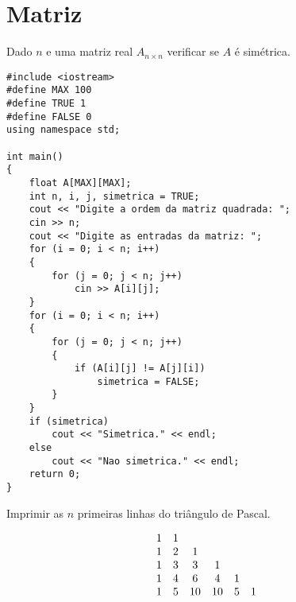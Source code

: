 \documentclass[a4paper]{memoir}
\begin{document}
\chapter{Matriz}

\begin{center}
\end{center}

\begin{prob}\label{prob306.cpp}
Dado $n$ e uma matriz real $A_{n \times n}$ verificar se $A$ é simétrica.
\end{prob}

\begin{sol}
\begin{lstlisting}
#include <iostream>
#define MAX 100
#define TRUE 1
#define FALSE 0
using namespace std;

int main()
{
    float A[MAX][MAX];
    int n, i, j, simetrica = TRUE;
    cout << "Digite a ordem da matriz quadrada: ";
    cin >> n;
    cout << "Digite as entradas da matriz: ";
    for (i = 0; i < n; i++)
    {
        for (j = 0; j < n; j++)
            cin >> A[i][j];
    }
    for (i = 0; i < n; i++)
    {
        for (j = 0; j < n; j++)
        {
            if (A[i][j] != A[j][i])
                simetrica = FALSE;
        }
    }
    if (simetrica)
        cout << "Simetrica." << endl;
    else
        cout << "Nao simetrica." << endl;
    return 0;
}
\end{lstlisting}
\end{sol}

\begin{prob}\label{prob307.cpp}
Imprimir as $n$ primeiras linhas do triângulo de Pascal.

\[
\begin{array}{*{20}c}
   1 & 1 & {} & {} & {} & {}  \\
   1 & 2 & 1 & {} & {} & {}  \\
   1 & 3 & 3 & 1 & {} & {}  \\
   1 & 4 & 6 & 4 & 1 & {}  \\
   1 & 5 & {10} & {10} & 5 & 1  \\
 \end{array}
\]


\end{prob}
\end{document}
